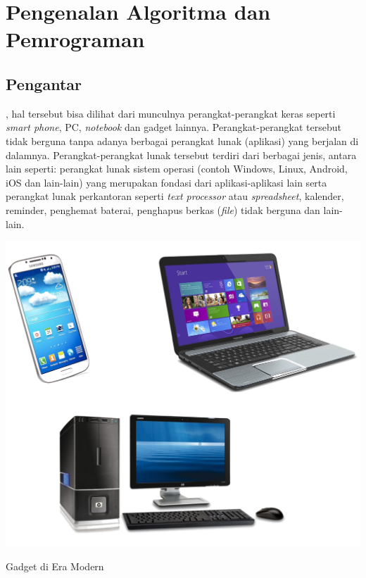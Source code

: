 \chapter{Pengenalan Algoritma dan Pemrograman}\label{ch:pengantarAlgoritma}

%
%

\section{Pengantar}

, hal tersebut bisa dilihat dari munculnya perangkat-perangkat keras seperti \textit{smart phone}, PC, \textit{notebook} dan gadget lainnya. Perangkat-perangkat tersebut tidak berguna tanpa adanya berbagai perangkat lunak (aplikasi) yang berjalan di dalamnya. Perangkat-perangkat lunak tersebut terdiri dari berbagai jenis, antara lain seperti: perangkat lunak sistem operasi (contoh Windows, Linux, Android, iOS dan lain-lain) yang merupakan fondasi dari aplikasi-aplikasi lain serta perangkat lunak perkantoran seperti \textit{text processor} atau \textit{spreadsheet}, kalender, reminder, penghemat baterai, penghapus berkas (\textit{file}) tidak berguna dan lain-lain. 
 
\begin{marginfigure}
\includegraphics[scale=0.3]{fig/1/Gambar1.png}
\caption{Gadget di Era Modern}
\label{fig:gadgetModern}	
\end{marginfigure}

